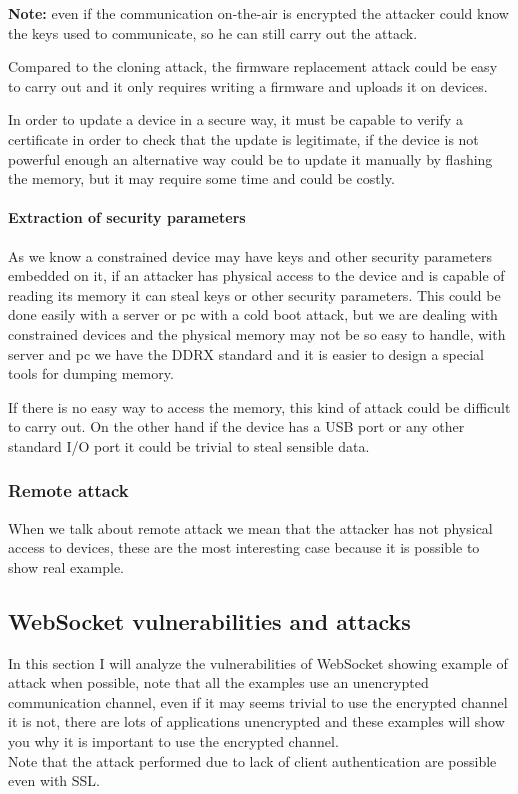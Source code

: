 	\textbf{Note:} even if the communication on-the-air is encrypted the attacker could know the keys used to communicate, so he can still carry out the attack.\newline
	
	Compared to the cloning attack, the firmware replacement attack could be easy to carry out and it only requires writing a firmware and uploads it on devices.\newline
	
	In order to update a device in a secure way, it must be capable to verify a certificate in order to check that the update is legitimate, if the device is not powerful enough an alternative way could be to update it manually by flashing the memory, but it may require some time and could be costly.\newline
	
	\paragraph{Extraction of security parameters}
	As we know a constrained device may have keys and other security parameters embedded on it, if an attacker has physical access to the device and is capable of reading its memory it can steal keys or other security parameters.\newline
	This could be done easily with a server or pc with a cold boot attack, but we are dealing with constrained devices and the physical memory may not be so easy to handle, with server and pc we have the DDRX standard and it is easier to design a special tools for dumping memory.\newline
	
	If there is no easy way to access the memory, this kind of attack could be difficult to carry out.
	On the other hand if the device has a USB port or any other standard I/O port it could be trivial to steal sensible data.
	
	
	\subsubsection{Remote attack}
	When we talk about remote attack we mean that the attacker has not physical access to devices, these are the most interesting case because it is possible to show real example.
	
	
	\subsection{WebSocket vulnerabilities and attacks}
	In this section I will analyze the vulnerabilities of WebSocket showing example of attack when possible, note that
	all the examples use an unencrypted communication channel, even if it may seems trivial to use the encrypted channel
	it is not, there are lots of applications unencrypted and these examples will show you why it is important to use
	the encrypted channel.\\
	Note that the attack performed due to lack of client authentication are possible even with SSL.
	
